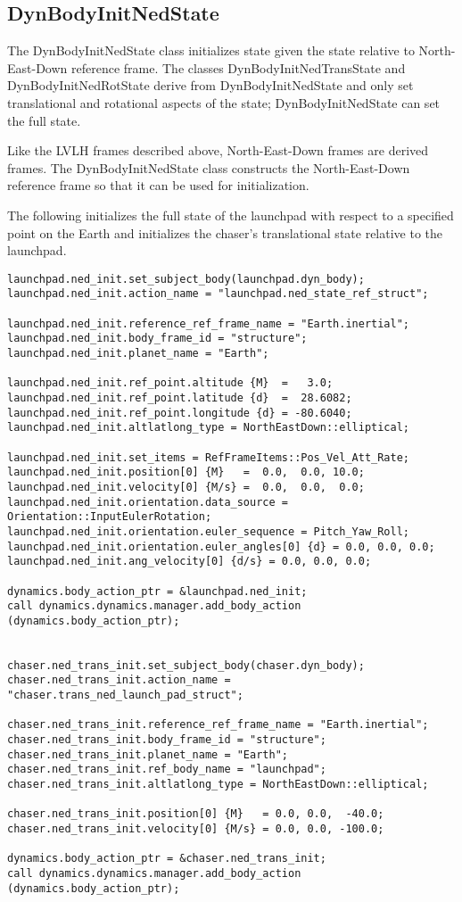 \subsection{DynBodyInitNedState}

The DynBodyInitNedState class initializes state
given the state relative to North-East-Down reference frame.
The classes DynBodyInitNedTransState and DynBodyInitNedRotState
derive from DynBodyInitNedState and only set translational and
rotational aspects of the state; DynBodyInitNedState can set the
full state.

Like the LVLH frames described above,
North-East-Down frames are derived frames.
The DynBodyInitNedState class
constructs the North-East-Down reference frame
so that it can be used for initialization.

The following initializes the full state of the launchpad
with respect to a specified point on the Earth
and initializes the chaser's translational state relative to the launchpad.

\begin{verbatim}
launchpad.ned_init.set_subject_body(launchpad.dyn_body);
launchpad.ned_init.action_name = "launchpad.ned_state_ref_struct";

launchpad.ned_init.reference_ref_frame_name = "Earth.inertial";
launchpad.ned_init.body_frame_id = "structure";
launchpad.ned_init.planet_name = "Earth";

launchpad.ned_init.ref_point.altitude {M}  =   3.0;
launchpad.ned_init.ref_point.latitude {d}  =  28.6082;
launchpad.ned_init.ref_point.longitude {d} = -80.6040;
launchpad.ned_init.altlatlong_type = NorthEastDown::elliptical;

launchpad.ned_init.set_items = RefFrameItems::Pos_Vel_Att_Rate;
launchpad.ned_init.position[0] {M}   =  0.0,  0.0, 10.0;
launchpad.ned_init.velocity[0] {M/s} =  0.0,  0.0,  0.0;
launchpad.ned_init.orientation.data_source = Orientation::InputEulerRotation;
launchpad.ned_init.orientation.euler_sequence = Pitch_Yaw_Roll;
launchpad.ned_init.orientation.euler_angles[0] {d} = 0.0, 0.0, 0.0;
launchpad.ned_init.ang_velocity[0] {d/s} = 0.0, 0.0, 0.0;

dynamics.body_action_ptr = &launchpad.ned_init;
call dynamics.dynamics.manager.add_body_action (dynamics.body_action_ptr);


chaser.ned_trans_init.set_subject_body(chaser.dyn_body);
chaser.ned_trans_init.action_name = "chaser.trans_ned_launch_pad_struct";

chaser.ned_trans_init.reference_ref_frame_name = "Earth.inertial";
chaser.ned_trans_init.body_frame_id = "structure";
chaser.ned_trans_init.planet_name = "Earth";
chaser.ned_trans_init.ref_body_name = "launchpad";
chaser.ned_trans_init.altlatlong_type = NorthEastDown::elliptical;

chaser.ned_trans_init.position[0] {M}   = 0.0, 0.0,  -40.0;
chaser.ned_trans_init.velocity[0] {M/s} = 0.0, 0.0, -100.0;

dynamics.body_action_ptr = &chaser.ned_trans_init;
call dynamics.dynamics.manager.add_body_action (dynamics.body_action_ptr);
\end{verbatim}

